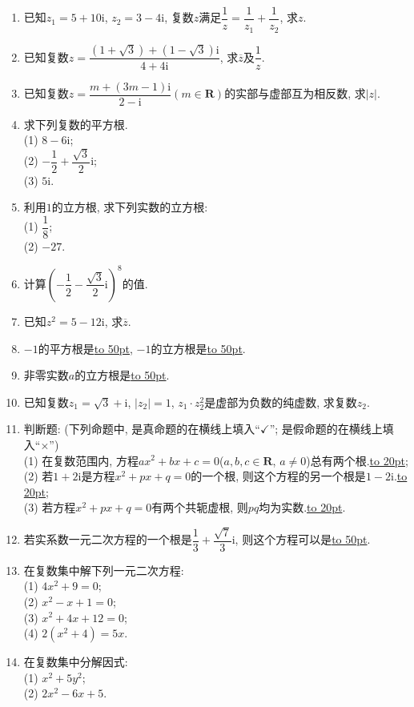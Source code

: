 \documentclass[10pt,a4paper]{article}
\newcommand{\blank}[1]{\underline{\hbox to #1pt{}}}
\begin{document}
\begin{enumerate}[1.]
\item 已知$z_1=5+10\mathrm{i}$, $z_2=3-4\mathrm{i}$, 复数$z$满足$\dfrac 1z=\dfrac 1{z_1}+\dfrac 1{z_2}$, 求$z$.
\item 已知复数$z=\dfrac{(1+\sqrt 3)+(1-\sqrt 3)\mathrm{i}}{4+4\mathrm{i}}$, 求$\overline z$及$\dfrac 1z$.
\item 已知复数$z=\dfrac{m+(3m-1){\mathrm{i}}}{2-{\mathrm{i}}}(m\in \mathbf{R})$的实部与虚部互为相反数, 求$|z|$.
\item 求下列复数的平方根.\\
(1) $8-6\mathrm{i}$;\\ 
(2) $-\dfrac 12+\dfrac{\sqrt 3}2\mathrm{i}$;\\
(3) $5\mathrm{i}$.	
\item 利用$1$的立方根, 求下列实数的立方根:\\
(1) $\dfrac 18$;\\ 
(2) $-27$.
\item 计算$(-\dfrac 12-\dfrac{\sqrt 3}2\mathrm{i})^8$的值.
\item 已知$z^2=5-12\mathrm{i}$, 求$\overline z$.
\item $-1$的平方根是\blank{50}, $-1$的立方根是\blank{50}.
\item 非零实数$a$的立方根是\blank{50}.
\item 已知复数$z_1=\sqrt 3+\mathrm{i}$, $|z_2|=1$, $z_1\cdot z_2^2$是虚部为负数的纯虚数, 求复数$z_2$.
\item 判断题: (下列命题中, 是真命题的在横线上填入``$\checkmark$''; 是假命题的在横线上填入``$\times$'')\\
(1) 在复数范围内, 方程$ax^2+bx+c=0$($a,b,c\in \mathbf{R}$, $a\ne 0$)总有两个根.\blank{20};\\
(2) 若$1+2\mathrm{i}$是方程$x^2+px+q=0$的一个根, 则这个方程的另一个根是$1-2\mathrm{i}$.\blank{20};\\
(3) 若方程$x^2+px+q=0$有两个共轭虚根, 则$pq$均为实数.\blank{20}.
\item 若实系数一元二次方程的一个根是$\dfrac 13+\dfrac{\sqrt 7}3\mathrm{i}$, 则这个方程可以是\blank{50}.
\item 在复数集中解下列一元二次方程:\\
(1) $4x^2+9=0$;\\ 
(2) $x^2-x+1=0$;\\
(3) $x^2+4x+12=0$;\\ 
(4) $2(x^2+4)=5x$.
\item 在复数集中分解因式:\\
(1) $x^2+5y^2$;\\ 
(2) $2x^2-6x+5$.

\end{enumerate}
\end{document}
